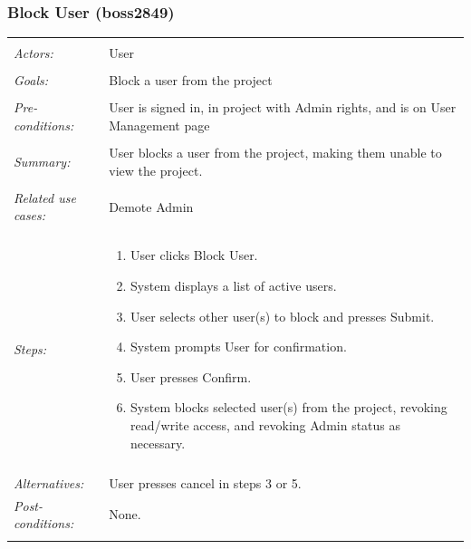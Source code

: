 \documentclass[11pt]{report}
\begin{document}
\subsubsection{Block User (boss2849)}
\begin{tabular}{ p{2cm} p{12cm} }
 \hline
 \\
 \textit{Actors:} & User \\ 
 \\
 \textit{Goals:} & Block a user from the project \\
 \\
 \textit{Pre-conditions:} & User is signed in, in project with Admin rights, and is on User Management page \\
 \\
 \textit{Summary:} & User blocks a user from the project, making them unable to view the project. \\ 
 \\
 \textit{Related use cases:} & Demote Admin \\ 
 \\
 \textit{Steps:} & \begin{enumerate}
  \item User clicks Block User.
  \item System displays a list of active users.
  \item User selects other user(s) to block and presses Submit.
  \item System prompts User for confirmation.
  \item User presses Confirm.
  \item System blocks selected user(s) from the project, revoking read/write access, and revoking Admin status as necessary.
 \end{enumerate} \\
 \\
 \textit{Alternatives:} & User presses cancel in steps 3 or 5.
 \\
 \textit{Post-conditions:} & None. \\
 \\
\hline
\end{tabular}
\end{document}
